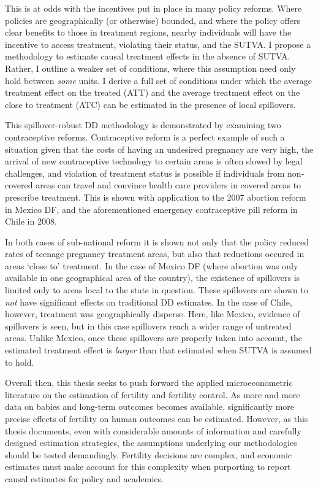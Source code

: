 This is at odds with the incentives put in place in many policy reforms. Where
policies are geographically (or otherwise) bounded, and where the policy offers
clear benefits to those in treatment regions, nearby individuals will have the
incentive to access treatment, violating their status, and the SUTVA. I propose
a methodology to estimate causal treatment effects in the absence of SUTVA.
Rather, I outline a weaker set of conditions, where this assumption need only 
hold between \emph{some} units.  I derive a full set of conditions under which 
the average treatment effect on the treated (ATT) and the average treatment 
effect on the close to treatment (ATC) can be estimated in the presence of
local spillovers.

This spillover-robust DD methodology is demonstrated by examining two 
contraceptive reforms.  Contraceptive reform is a perfect example of such a 
situation given that the costs of having an undesired pregnancy are very high, 
the arrival of new contraceptive technology to certain areas is often slowed by 
legal challenges, and violation of treatment status is possible if individuals 
from non-covered areas can travel and convince health care providers in covered 
areas to prescribe treatment. This is shown with application to the 2007 abortion 
reform in Mexico DF, and the aforementioned emergency contraceptive pill reform 
in Chile in 2008.

In both cases of sub-national reform it is shown not only that the policy 
reduced rates of teenage pregnancy treatment areas, but also that reductions
occured in areas `close to' treatment.  In the case of Mexico DF (where 
abortion was only available in one geographical area of the country), the 
existence of spillovers is limited only to areas local to the state in question.
These spillovers are shown to \emph{not} have significant effects on traditional
DD estimates.  In the case of Chile, however, treatment was geographically 
disperse. Here, like Mexico, evidence of spillovers is seen, but in this case
spillovers reach a wider range of untreated areas. Unlike Mexico, once these 
spillovers are properly taken into account, the estimated treatment effect is 
\emph{larger} than that estimated when SUTVA is assumed to hold.

Overall then, this thesis seeks to push forward the applied microeconometric 
literature on the estimation of fertility and fertility control.  As more and
more data on babies and long-term outcomes becomes available, significantly
more precise effects of fertility on human outcomes can be estimated.  However,
as this thesis documents, even with considerable amounts of information and
carefully designed estimation strategies, the assumptions underlying our 
methodologies should be tested demandingly.  Fertility decisions are complex, 
and economic estimates must make account for this complexity when purporting to
report causal estimates for policy and academics.
